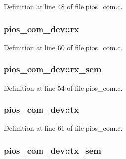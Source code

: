 Definition at line 48 of file pios\-\_\-com.\-c.

\hypertarget{structpios__com__dev_a505ae5ef4b8b02aa59d47da4275f9c48}{
\subsubsection[{rx}]{ pios\-\_\-com\-\_\-dev\-::rx}}\label{structpios__com__dev_a505ae5ef4b8b02aa59d47da4275f9c48}


Definition at line 60 of file pios\-\_\-com.\-c.

\hypertarget{structpios__com__dev_a7fc0be64ae4ec8b66c6cc9fb0d14a912}{
\subsubsection[{rx\-\_\-sem}]{ pios\-\_\-com\-\_\-dev\-::rx\-\_\-sem}}\label{structpios__com__dev_a7fc0be64ae4ec8b66c6cc9fb0d14a912}


Definition at line 54 of file pios\-\_\-com.\-c.

\hypertarget{structpios__com__dev_a7a373bf857434538304aae2c831929c8}{
\subsubsection[{tx}]{ pios\-\_\-com\-\_\-dev\-::tx}}\label{structpios__com__dev_a7a373bf857434538304aae2c831929c8}


Definition at line 61 of file pios\-\_\-com.\-c.

\hypertarget{structpios__com__dev_adf20399b709462af4eafca64b6394aa3}{
\subsubsection[{tx\-\_\-sem}]{ pios\-\_\-com\-\_\-dev\-::tx\-\_\-sem}}\label{structpios__com__dev_adf20399b709462af4eafca64b6394aa3}


